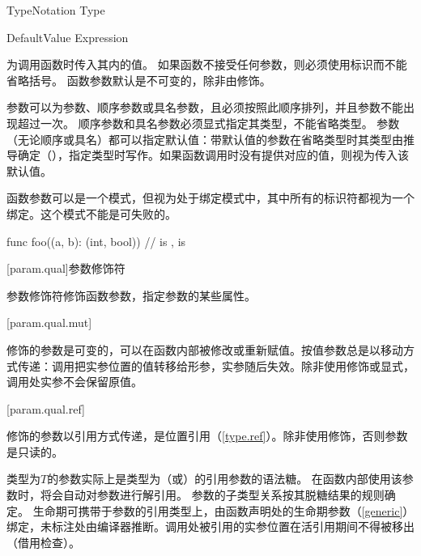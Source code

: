 \begin{bnf}{TypeNotation}
    \terminal{:} Type
\end{bnf}

\begin{bnf}{DefaultValue}
    \terminal{=} Expression
\end{bnf}

\pnum
{}为调用函数时传入其内的值。
如果函数不接受任何参数，则必须使用\tcode{()}标识而不能省略括号。
函数参数默认是不可变的，除非由修饰。

\pnum
参数可以为参数、顺序参数或具名参数，且必须按照此顺序排列，并且参数不能出现超过一次。
顺序参数和具名参数必须显式指定其类型，不能省略类型。
参数（无论顺序或具名）都可以指定默认值：带默认值的参数在省略类型时其类型由推导确定（），指定类型时写作。如果函数调用时没有提供对应的值，则视为传入该默认值。

\pnum
函数参数可以是一个模式，但视为处于绑定模式中，其中所有的标识符都视为一个绑定。这个模式不能是可失败的。

\enterexample
\begin{codeblock}

func foo((a, b): (int, bool)) {
    //  is ,  is 
}

\end{codeblock}
\exitexample

[param.qual]{参数修饰符}

\pnum
参数修饰符修饰函数参数，指定参数的某些属性。

[param.qual.mut]{}

\pnum
{}修饰的参数是可变的，可以在函数内部被修改或重新赋值。\enternote 按值参数总是以移动方式传递：调用把实参位置的值转移给形参，实参随后失效。除非使用修饰或显式，调用处实参不会保留原值。\exitnote

[param.qual.ref]{}

\pnum
{}修饰的参数以引用方式传递，是位置引用（\ref{type.ref}）。除非使用修饰，否则参数是只读的。

\pnum
类型为$T$的参数实际上是类型为（或）的引用参数的语法糖。
在函数内部使用该参数时，将会自动对参数进行解引用。
参数的子类型关系按其脱糖结果的规则确定。
生命期可携带于参数的引用类型上，由函数声明处的生命期参数（\ref{generic}）绑定，未标注处由编译器推断。调用处被引用的实参位置在活引用期间不得被移出（借用检查）。

